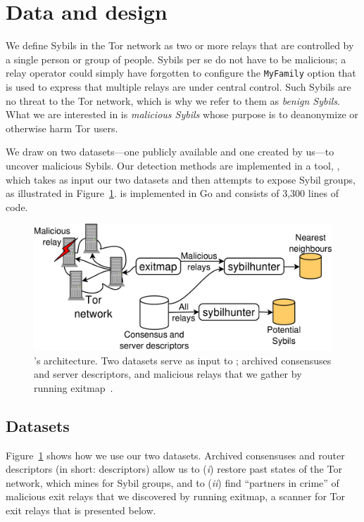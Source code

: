 \section{Data and design}
\label{sec:design}
We define Sybils in the Tor network as two or more relays that are controlled by
a single person or group of people.  Sybils per se do not have to be malicious;
a relay operator could simply have forgotten to configure the \texttt{MyFamily}
option that is used to express that multiple relays are under central control.
Such Sybils are no threat to the Tor network, which is why we refer to them as
\emph{benign Sybils}.  What we are interested in is \emph{malicious Sybils}
whose purpose is to deanonymize or otherwise harm Tor users.

We draw on two datasets---one publicly available and one created by us---to
uncover malicious Sybils.  Our detection methods are implemented in a tool,
\sys, which takes as input our two datasets and then attempts to expose Sybil
groups, as illustrated in Figure~\ref{fig:system}.  \Sys is implemented in Go
and consists of 3,300 lines of code.

\begin{figure}[t]
	\centering
	\includegraphics[width=\linewidth]{diagrams/system_architecture.pdf}
	\caption{\Sys's architecture.  Two datasets serve as input to
		\sys; archived consensuses and server descriptors, and malicious
		relays that we gather by running exitmap~\cite{Winter2014a}.}
	\label{fig:system}
\end{figure}

\subsection{Datasets}
\label{sec:datasets}
Figure~\ref{fig:system} shows how we use our two datasets.  Archived consensuses
and router descriptors (in short: descriptors) allow us to (\emph{i}) restore
past states of the Tor network, which \sys mines for Sybil groups, and to
(\emph{ii}) find ``partners in crime'' of malicious exit relays that we
discovered by running exitmap, a scanner for Tor exit relays that is presented
below.


